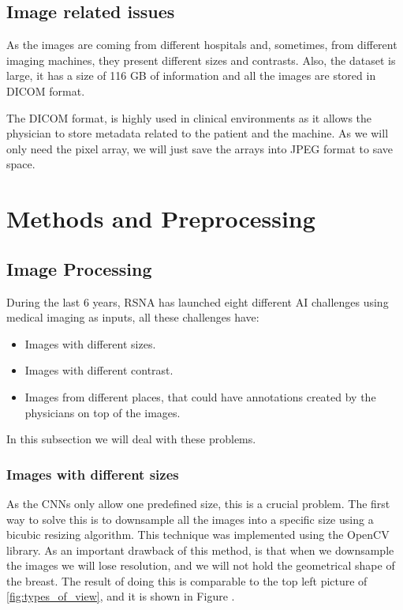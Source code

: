 \documentclass[conference]{IEEEtran}
\begin{document}
\subsection{Image related issues}

As the images are coming from different hospitals and, sometimes, from different imaging machines, they present different sizes and contrasts. Also, the dataset is large, it has a size of 116 GB of information and all the images are stored in DICOM format.  

The DICOM format, is highly used in clinical environments as it allows the physician to store metadata related to the patient and the machine. As we will only need the pixel array, we will just save the arrays into JPEG format to save space. 

\section{Methods and Preprocessing}

\subsection{Image Processing}
During the last 6 years, RSNA has launched eight different AI challenges using medical imaging as inputs, all these challenges have:

\begin{itemize}
\item Images with different sizes. 
\item Images with different contrast. 
\item Images from different places, that could have annotations created by the physicians on top of the images. 
\end{itemize}

In this subsection we will deal with these problems. 

\subsubsection{Images with different sizes}

As the CNNs only allow one predefined size, this is a crucial problem. The first way to solve this is to downsample all the images into a specific size using a bicubic resizing algorithm. This technique was implemented using the OpenCV library. As an important drawback of this method, is that when we downsample the images we will lose resolution, and we will not hold the geometrical shape of the breast. The result of doing this is comparable to the top left picture of \ref{fig:types_of_view}, and it is shown in Figure .
\end{document}
